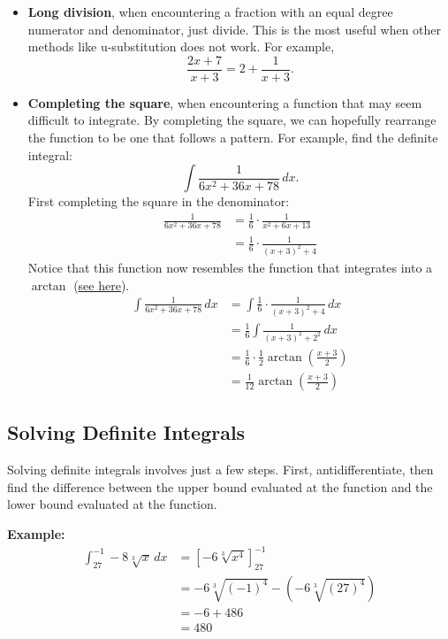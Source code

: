 \documentclass[12pt]{article}
\begin{document}
\begin{itemize}
    \item \textbf{Long division}, when encountering a fraction with an equal degree numerator and denominator, just divide. This is the most useful when other methods like u-substitution does not work. For example,
          \[ \frac{2x+7}{x+3} = 2 + \frac{1}{x+3}. \]

    \item \textbf{Completing the square}, when encountering a function that may seem difficult to integrate. By completing the square, we can hopefully rearrange the function to be one that follows a pattern. For example, find the definite integral:
          \[ \int \frac{1}{6x^2+36x+78} \, dx. \]
          First completing the square in the denominator:
          \begin{align*}
              \frac{1}{6x^2+36x+78} & = \frac{1}{6} \cdot \frac{1}{x^2+6x+13}   \\[6pt]
                                    & = \frac{1}{6} \cdot \frac{1}{(x+3)^2 + 4}
          \end{align*}
          Notice that this function now resembles the function that integrates into a $\arctan$ (\hyperref[sec:arctanintegral]{see here}).
          \begin{align*}
              \int \frac{1}{6x^2+36x+78} \, dx & = \int \frac{1}{6} \cdot \frac{1}{(x+3)^2 + 4} \, dx                 \\[6pt]
                                               & = \frac{1}{6} \int \frac{1}{(x+3)^2 + 2^2} \, dx                     \\[6pt]
                                               & = \frac{1}{6} \cdot \frac{1}{2} \arctan \left( \frac{x+3}{2} \right) \\[6pt]
                                               & = \frac{1}{12} \arctan \left( \frac{x+3}{2} \right)
          \end{align*}
\end{itemize}

\subsection{Solving Definite Integrals}
Solving definite integrals involves just a few steps. First, antidifferentiate, then find the difference between the upper bound evaluated at the function and the lower bound evaluated at the function.

\noindent \textbf{Example:}
\begin{align*}
    \int_{27}^{-1} -8 \sqrt[3]{x} \, dx & = \left[ -6 \sqrt[3]{x^4} \right]_{27}^{-1}                \\
                                        & = -6 \sqrt[3]{(-1)^4} - \left( -6 \sqrt[3]{(27)^4} \right) \\
                                        & = -6 + 486                                                 \\
                                        & = 480
\end{align*}
\end{document}
